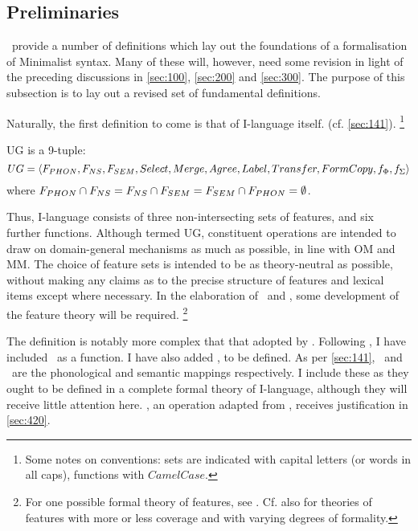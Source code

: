 \subsection{Preliminaries}\label{sec:410}

\CS\ provide a number of definitions which lay out the foundations of a formalisation of Minimalist syntax. Many of these will, however, need some revision in light of the preceding discussions in \autoref{sec:100}, \autoref{sec:200} and \autoref{sec:300}. The purpose of this subsection is to lay out a revised set of fundamental definitions.

Naturally, the first definition to come is that of I-language itself. (cf. \autoref{sec:141}).%
\footnote{\label{fn:FormalConventions}Some notes on conventions: sets are indicated with capital letters (or words in all caps), functions with $CamelCase$.}

\begin{definition}\label{def:UG}
    UG is a 9-tuple:%
    \[UG=\langle F_{PHON}, F_{NS}, F_{SEM}, Select, Merge, Agree, Label, Transfer, FormCopy, f_\Phi, f_\Sigma \rangle\]%
    where $F_{PHON}\cap F_{NS}=F_{NS}\cap F_{SEM}=F_{SEM}\cap F_{PHON}=\emptyset$.
\end{definition}
\noindent
Thus, I-language consists of three non-intersecting sets of features, and six further functions. Although termed UG, constituent operations are intended to draw on domain-general mechanisms as much as possible, in line with OM and MM. The choice of feature sets is intended to be as theory-neutral as possible, without making any claims as to the precise structure of features and lexical items except where necessary. In the elaboration of \Label\ and \Agree, some development of the feature theory will be required.%
\footnote{For one possible formal theory of features, see \textcite{AdgerD_2010,AdgerD.SvenoniusP_2011}. Cf. also \textcite{CarlsonJOE_2010,SongC_2019,StockwellR_2015,RobertsI_2019} for theories of features with more or less coverage and with varying degrees of formality.}

The definition is notably more complex that that adopted by \CS. Following \textcite{MilwayD_2021}, I have included \Agree\ as a function. I have also added \Label, to be defined. As per \autoref{sec:141}, \ffSM\ and \ffCI\ are the phonological and semantic mappings respectively. I include these as they ought to be defined in a complete formal theory of I-language, although they will receive little attention here. \FormCopy, an operation adapted from \textcite{ChomskyN_2021}, receives justification in \autoref{sec:420}.

